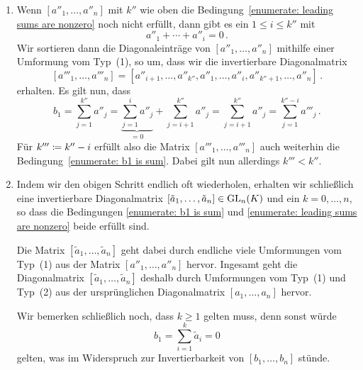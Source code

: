 \documentclass[a4paper,10pt,numbers = noenddot]{scrartcl}
\begin{document}
\begin{enumerate}[label = \arabic*)]
  \item
    Wenn $[a''_1, \dotsc, a''_n]$ mit $k''$ wie oben die Bedingung~\ref*{enumerate: leading sums are nonzero} noch nicht erfüllt, dann gibt es ein $1 \leq i \leq k''$ mit 
    \[
        a''_1 + \dotsb + a''_i
      = 0 \,.
    \]
    Wir sortieren dann die Diagonaleinträge von $[a''_1, \dotsc, a''_n]$ mithilfe einer Umformung vom Typ~(1), so um, dass wir die invertierbare Diagonalmatrix
    \[
        [a'''_1, \dotsc, a'''_n]
      = [a''_{i+1}, \dotsc, a''_{k''}, a''_1, \dotsc, a''_i, a''_{k''+1}, \dotsc, a''_n] \,.
    \]
    erhalten.
    Es gilt nun, dass
    \[
        b_1
      = \sum_{j=1}^{k''} a''_j
      = \underbrace{ \sum_{j=1}^i a''_j }_{=0} + \sum_{j=i+1}^{k''} a''_j
      = \sum_{j=i+1}^{k''} a''_j
      = \sum_{j=1}^{k''-i} a'''_j \,.
    \]
    Für $k''' \coloneqq k''- i$ erfüllt also die Matrix $[a'''_1, \dotsc, a'''_n]$ auch weiterhin die Bedingung~\ref*{enumerate: b1 is sum}.
    Dabei gilt nun allerdings $k''' < k''$.
  \item
    Indem wir den obigen Schritt endlich oft wiederholen, erhalten wir schließlich eine invertierbare Diagonalmatrix $[\tilde{a}_1, \dotsc, \tilde{a}_n] \in \operatorname{GL}_{n}(K)$ und ein $k = 0, \dotsc, n$, so dass die Bedingungen \ref*{enumerate: b1 is sum} und \ref*{enumerate: leading sums are nonzero} beide erfüllt sind.
    
    Die Matrix $[\tilde{a}_1, \dotsc, \tilde{a}_n]$ geht dabei durch endliche viele Umformungen vom Typ~(1) aus der Matrix $[a''_1, \dotsc, a''_n]$ hervor.
    Ingesamt geht die Diagonalmatrix $[\tilde{a}_1, \dotsc, \tilde{a}_n]$ deshalb durch Umformungen vom Typ~(1) und Typ~(2) aus der ursprünglichen Diagonalmatrix $[a_1, \dotsc, a_n]$ hervor.
    
    Wir bemerken schließlich noch, dass $k \geq 1$ gelten muss, denn sonst würde
    \[
        b_1
      = \sum_{i=1}^k \tilde{a}_i = 0
    \]
    gelten, was im Widerspruch zur Invertierbarkeit von $[b_1, \dotsc, b_n]$ stünde.
\end{enumerate}
\end{document}
